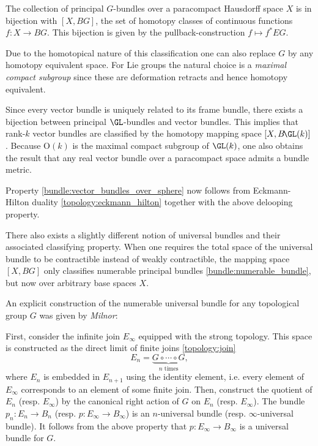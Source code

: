     \begin{property}[Classification]\label{bundle:classification}
        The collection of principal $G$-bundles over a paracompact Hausdorff space $X$ is in bijection with $[X,BG]$, the set of homotopy classes of continuous functions $f:X\rightarrow BG$. This bijection is given by the pullback-construction $f\mapsto f^*EG$.

        Due to the homotopical nature of this classification one can also replace $G$ by any homotopy equivalent space. For Lie groups the natural choice is a \textit{maximal compact subgroup} since these are deformation retracts and hence homotopy equivalent.
    \end{property}
    \begin{result}
        Since every vector bundle is uniquely related to its frame bundle, there exists a bijection between principal $\GL$-bundles and vector bundles. This implies that rank-$k$ vector bundles are classified by the homotopy mapping space $[X,B\!\GL(k)]$. Because $\mathrm{O}(k)$ is the maximal compact subgroup of $\GL(k)$, one also obtains the result that any real vector bundle over a paracompact space admits a bundle metric.

        Property \ref{bundle:vector_bundles_over_sphere} now follows from Eckmann-Hilton duality \ref{topology:eckmann_hilton} together with the above delooping property.
    \end{result}
    \begin{remark}
        There also exists a slightly different notion of universal bundles and their associated classifying property. When one requires the total space of the universal bundle to be contractible instead of weakly contractible, the mapping space $[X,BG]$ only classifies numerable principal bundles \ref{bundle:numerable_bundle}, but now over arbitrary base spaces $X$.
    \end{remark}

    An explicit construction of the numerable universal bundle for any topological group $G$ was given by \textit{Milnor}:
    \begin{construct}
        First, consider the infinite join $E_\infty$ equipped with the strong topology. This space is constructed as the direct limit of finite joins \ref{topology:join} \[E_n=\underbrace{G\circ\cdots\circ G}_{n\text{ times}},\] where $E_n$ is embedded in $E_{n+1}$ using the identity element, i.e. every element of $E_\infty$ corresponds to an element of some finite join. Then, construct the quotient of $E_n$ (resp. $E_\infty$) by the canonical right action of $G$ on $E_n$ (resp. $E_\infty$). The bundle $p_n:E_n\rightarrow B_n$ (resp. $p:E_\infty\rightarrow B_\infty$) is an $n$-universal bundle (resp. $\infty$-universal bundle). It follows from the above property that $p:E_\infty\rightarrow B_\infty$ is a universal bundle for $G$.
    \end{construct}

